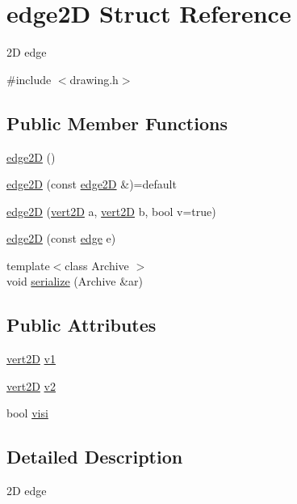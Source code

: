 \hypertarget{structedge2_d}{}\section{edge2D Struct Reference}
\label{structedge2_d}


2D edge  




{\ttfamily \#include $<$drawing.\+h$>$}

\subsection*{Public Member Functions}
\begin{DoxyCompactItemize}
\item 
\hyperlink{structedge2_d_abac488760a745ba14a5a0c17693ed3e6}{edge2D} ()
\item 
\hyperlink{structedge2_d_a7ac9fa8099bd50b4f674b33646fd9b39}{edge2D} (const \hyperlink{structedge2_d}{edge2D} \&)=default
\item 
\hyperlink{structedge2_d_aebb6f464fabc842795f9c5b436c0760b}{edge2D} (\hyperlink{structvert2_d}{vert2D} a, \hyperlink{structvert2_d}{vert2D} b, bool v=true)
\item 
\hyperlink{structedge2_d_a96aeeb6aea41f0963e8ea01dab85a9b4}{edge2D} (const \hyperlink{structedge}{edge} e)
\item 
{\footnotesize template$<$class Archive $>$ }\\void \hyperlink{structedge2_d_a5265edb51b9daf416189a266265b96d6}{serialize} (Archive \&ar)
\end{DoxyCompactItemize}
\subsection*{Public Attributes}
\begin{DoxyCompactItemize}
\item 
\hyperlink{structvert2_d}{vert2D} \hyperlink{structedge2_d_a9fa8c5d5fefa56cd6e0e2a31d301f507}{v1}
\item 
\hyperlink{structvert2_d}{vert2D} \hyperlink{structedge2_d_a1f21e0ab04e114edb954e03fe2c3a60a}{v2}
\item 
bool \hyperlink{structedge2_d_a140384dd970666607f730aece19be91e}{visi}
\end{DoxyCompactItemize}


\subsection{Detailed Description}
2D edge 

